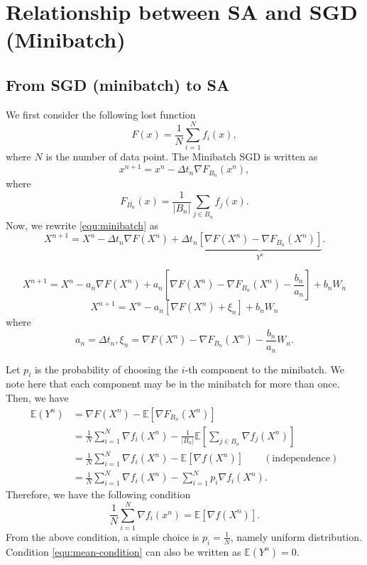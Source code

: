 \chapter{Relationship between SA and SGD (Minibatch)}
\section{From SGD (minibatch) to SA}
We first consider the following lost function 
$$ 
F(x) = \frac{1}{N} \sum_{i=1}^N f_i(x),
$$ 
where $N$ is the number of data point. The Minibatch SGD is written
as 
\begin{equation} \label{equ:minibatch}
x^{n+1} = x^n - \Delta t_{n} \nabla F_{B_n}(x^n),
\end{equation}
where 
$$ 
F_{B_n}(x) = \frac{1}{|B_n|} \sum_{j \in B_n} f_j(x).
$$ 
Now, we rewrite \eqref{equ:minibatch} as 
\begin{equation} \label{equ:minibach-SA}
X^{n+1} = X^n - \Delta t_{n} \nabla F(X^n) + \Delta {t}_n
\underbrace{[\nabla F(X^n) - \nabla F_{B_n}(X^n)]}_{Y^n}. 
\end{equation}

\begin{equation} \label{equ:minibach-SA}
X^{n+1} = X^n - a_{n} \nabla F(X^n) + a_n
[\nabla F(X^n) - \nabla F_{B_n}(X^n)-\frac{b_n}{a_n}] + b_nW_n 
\end{equation}
\begin{equation} \label{equ:minibach-SA}
X^{n+1} = X^n - a_{n} [\nabla F(X^n) + \xi_n] + b_nW_n 
\end{equation}
where
$$
a_n=\Delta t_n, \xi_n=\nabla F(X^n) - \nabla F_{B_n}(X^n)-\frac{b_n}{a_n}W_n.
$$

Let $p_i$ is the probability of choosing the $i$-th component to
the minibatch. We note here that each component may be in the
minibatch for more than once. Then, we have 
$$ 
\begin{aligned}
\mathbb{E}(Y^n) &= \nabla F(X^n) - \mathbb{E} [\nabla F_{B_n}(X^n)] \\
&= \frac{1}{N} \sum_{i=1}^N \nabla f_i(X^n) - \frac{1}{|B_n|}
\mathbb{E}[\sum_{j\in B_n} \nabla f_j(X^n)] \\
&= \frac{1}{N} \sum_{i=1}^N \nabla f_i(X^n) - \mathbb{E}[\nabla
f(X^n)] \qquad (\text{independence}) \\
&= \frac{1}{N} \sum_{i=1}^N \nabla f_i(X^n) - \sum_{i=1}^N p_i \nabla
f_i(X^n).
\end{aligned}
$$ 
Therefore, we have the following condition
\begin{equation} \label{equ:mean-condition}
\frac{1}{N}\sum_{i=1}^N \nabla f_i(x^n) = \mathbb{E}[\nabla f(X^n)].
\end{equation}
From the above condition, a simple choice is $p_i = \frac{1}{N}$,
namely uniform distribution. Condition \eqref{equ:mean-condition}
can also be written as $\mathbb{E}(Y^n) = 0$.

